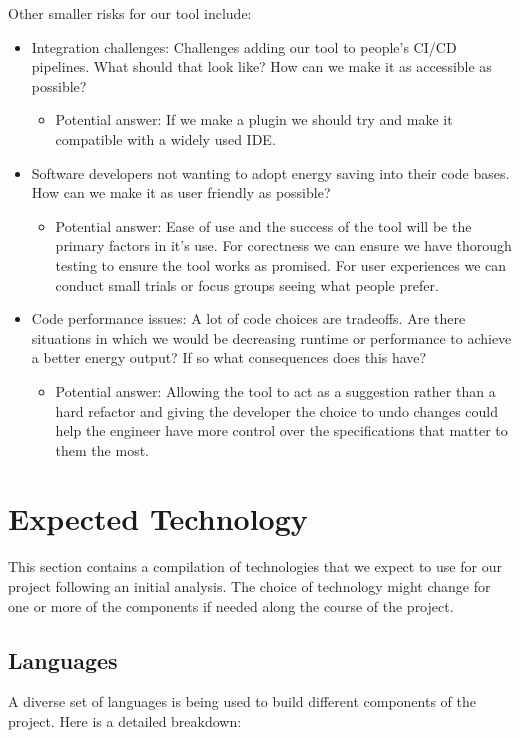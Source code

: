 \documentclass{article}
\begin{document}
Other smaller risks for our tool include:
\begin{itemize}
  \item Integration challenges: Challenges adding our tool to people's CI/CD pipelines. What should that look like? How can we make it as accessible as possible? 
  \begin{itemize}
    \item Potential answer: If we make a plugin we should try and make it compatible with a widely used IDE.
  \end{itemize} 
  \item Software developers not wanting to adopt energy saving into their code bases. How can we make it as user friendly as possible?
  \begin{itemize}
    \item Potential answer: Ease of use and the success of the tool will be the primary factors in it's use. For corectness we can ensure we have thorough testing to ensure the tool works as promised. For user experiences we can conduct small trials or focus groups seeing what people prefer.  
  \end{itemize} 
  \item Code performance issues: A lot of code choices are tradeoffs. Are there situations in which we would be decreasing runtime or performance to achieve a better energy output? If so what consequences does this have?
  \begin{itemize}
    \item Potential answer: Allowing the tool to act as a suggestion rather than a hard refactor and giving the developer the choice to undo changes could help the engineer have more control over the specifications that matter to them the most. 
  \end{itemize} 
\end{itemize} 

\section{Expected Technology}

This section contains a compilation of technologies that we expect to use for our project following an initial analysis. The choice of technology might change for one or more of the components if needed along the course of the project.

\subsection{Languages}
A diverse set of languages is being used to build different components of the project. Here is a detailed breakdown:
\end{document}
